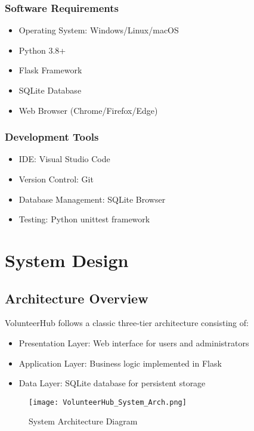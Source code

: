 \documentclass[12pt,a4paper]{report}
\begin{document}
\subsection{Software Requirements}
\begin{itemize}
    \item Operating System: Windows/Linux/macOS
    \item Python 3.8+
    \item Flask Framework
    \item SQLite Database
    \item Web Browser (Chrome/Firefox/Edge)
\end{itemize}

\subsection{Development Tools}
\begin{itemize}
    \item IDE: Visual Studio Code
    \item Version Control: Git
    \item Database Management: SQLite Browser
    \item Testing: Python unittest framework
\end{itemize}

\chapter{System Design}

\section{Architecture Overview}
VolunteerHub follows a classic three-tier architecture consisting of:

\begin{itemize}
    \item Presentation Layer: Web interface for users and administrators
    \item Application Layer: Business logic implemented in Flask
    \item Data Layer: SQLite database for persistent storage
\end{itemize}

\begin{figure}[H]
    \centering
    \texttt{[image: VolunteerHub\_System\_Arch.png]}
    \caption{System Architecture Diagram}
    \label{fig:architecture}
\end{figure}
\end{document}
